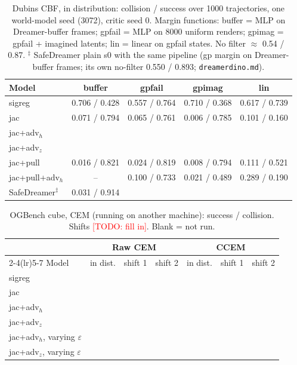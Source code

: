 \documentclass{article}
\newcommand{\todo}[1]{\textcolor{red}{[TODO: #1]}}
\begin{document}
\begin{table}[t]\centering\small
\caption{Dubins CBF, in distribution: collision / success over 1000 trajectories, one world-model seed (3072), critic seed 0. Margin functions: buffer = MLP on Dreamer-buffer frames; gpfail = MLP on 8000 uniform renders; gpimag = gpfail + imagined latents; lin = linear on gpfail states. No filter $\approx$ 0.54 / 0.87. $^\ddagger$ SafeDreamer plain s0 with the same pipeline (gp margin on Dreamer-buffer frames; its own no-filter 0.550 / 0.893; \texttt{dreamerdino.md}).}
\label{tab:cbf_id}
\begin{tabular}{lcccc}
\toprule
Model & buffer & gpfail & gpimag & lin \\
\midrule
sigreg & 0.706 / 0.428 & 0.557 / 0.764 & 0.710 / 0.368 & 0.617 / 0.739 \\
jac & 0.071 / 0.794 & 0.065 / 0.761 & 0.006 / 0.785 & 0.101 / 0.160 \\
jac+adv$_h$ &  &  &  &  \\
jac+adv$_z$ &  &  &  &  \\
\midrule
jac+pull & 0.016 / 0.821 & 0.024 / 0.819 & 0.008 / 0.794 & 0.111 / 0.521 \\
jac+pull+adv$_h$ & -- & 0.100 / 0.733 & 0.021 / 0.489 & 0.289 / 0.190 \\
\midrule
SafeDreamer$^\ddagger$ & 0.031 / 0.914 &  &  &  \\
\bottomrule
\end{tabular}
\end{table}

\begin{table}[t]\centering\small
\caption{OGBench cube, CEM (running on another machine): success / collision. Shifts \todo{fill in}. Blank = not run.}
\label{tab:cube}
\begin{tabular}{lcccccc}
\toprule
 & \multicolumn{3}{c}{Raw CEM} & \multicolumn{3}{c}{CCEM} \\
\cmidrule(lr){2-4}\cmidrule(lr){5-7}
Model & in dist. & shift 1 & shift 2 & in dist. & shift 1 & shift 2 \\
\midrule
sigreg &  &  &  &  &  &  \\
jac &  &  &  &  &  &  \\
jac+adv$_h$ &  &  &  &  &  &  \\
jac+adv$_z$ &  &  &  &  &  &  \\
jac+adv$_h$, varying $\varepsilon$ &  &  &  &  &  &  \\
jac+adv$_z$, varying $\varepsilon$ &  &  &  &  &  &  \\
\bottomrule
\end{tabular}
\end{table}
\end{document}
